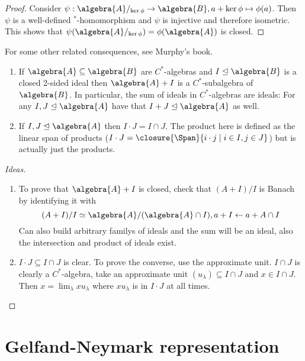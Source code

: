 \documentclass[a4paper]{article}
\begin{document}
\begin{proof}
	Consider $\psi: \algebra{A} /_{\ker \phi} \to  \algebra{B}, a + \ker \phi \mapsto \phi(a)$.
	Then $\psi$ is a well-defined $^*$-homomorphism and $\psi$ is injective and therefore isometric.
	This shows that $\psi(\algebra{A}/_{\ker \phi}) = \phi(\algebra{A})$ is closed.
\end{proof}

\begin{remark}
	For some other related consequences, see Murphy's book.
	\begin{enumerate}
		\item If $\algebra{A} \subseteq \algebra{B}$ are $C^*$-algebras and $I \trianglelefteq \algebra{B}$ is a closed 2-sided ideal then $\algebra{A} + I$ is a $C^*$-subalgebra of $\algebra{B}$. 
		In particular, the sum of ideals in $C^*$-algebras are ideals: For any $I,J \trianglelefteq \algebra{A}$ have that $I + J \trianglelefteq \algebra{A}$ as well.
		\item If $I, J \trianglelefteq \algebra{A}$ then $I \cdot J = I \cap J$.
		The product here is defined as the linear span of products ($I \cdot J = \closure{\Span}\{i \cdot j \mid i \in I, j \in J\}$) but is actually just the products.
	\end{enumerate}
\end{remark}


\begin{proof}[Ideas]~
	\begin{enumerate}
		\item To prove that $\algebra{A} + I$ is closed, check that $(A + I)/I$ is Banach by identifying it with
		\begin{equation*}
			(A + I) / I \simeq \algebra{A}/(\algebra{A} \cap I), a + I \leftarrow a + A \cap I
		\end{equation*}
		Can also build arbitrary familys of ideals and the sum will be an ideal, also the intersection and product of ideals exist.
		\item $I \cdot J \subseteq I \cap J$ is clear.
		To prove the converse, use the approximate unit.
		$I \cap J$ is clearly a $C^*$-algebra, take an approximate unit $(u_\lambda) \subseteq I \cap J$ and $x \in I \cap J$.
		Then $x = \lim_{\lambda} x u_\lambda$ where $x u_\lambda$ is in $I \cdot J$ at all times.
	\end{enumerate}
\end{proof}

\section{Gelfand-Neymark representation}
\end{document}
